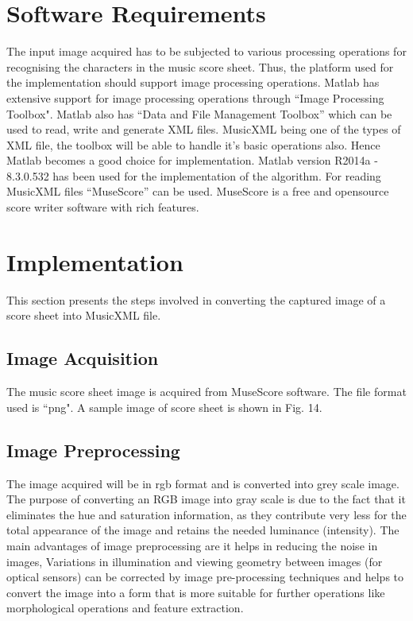 \documentclass[journal]{IEEEtran}
\begin{document}
\section{Software Requirements}
 The input image acquired has to be subjected to various processing operations for recognising the characters in the music score sheet. Thus, the platform used for the implementation  should support
image processing operations. Matlab has extensive support for image processing operations through “Image Processing Toolbox". Matlab also has “Data and File Management Toolbox” which can be used to read, write and generate XML files. MusicXML being one of the types of XML file, the toolbox will be able to handle it's basic operations also. Hence Matlab becomes a good choice for implementation. Matlab version R2014a - 8.3.0.532 has been used for the implementation of the algorithm. For reading MusicXML files “MuseScore” can be used. MuseScore is a free and opensource score writer software with rich features.

\section{Implementation}
This section presents the steps involved in converting the captured image of a score sheet into MusicXML file.


\subsection{Image Acquisition}
 The music score sheet image is acquired from MuseScore software. The file format used is ``png". A sample image of score sheet is shown in Fig. 14.
 
 
 \subsection{Image Preprocessing}
  The image acquired will be in rgb format and is converted into grey scale image. The purpose of converting an RGB image into gray scale is due to the fact that it eliminates the hue and saturation information, as they contribute very less for the total appearance of the image and retains the needed luminance (intensity).  The main advantages of image preprocessing are it helps in reducing the noise in images, Variations in illumination and viewing geometry between images (for optical sensors) can be corrected by image pre-processing techniques and helps to convert the image into a form that is more suitable for further
operations like morphological operations and feature extraction.
\end{document}
